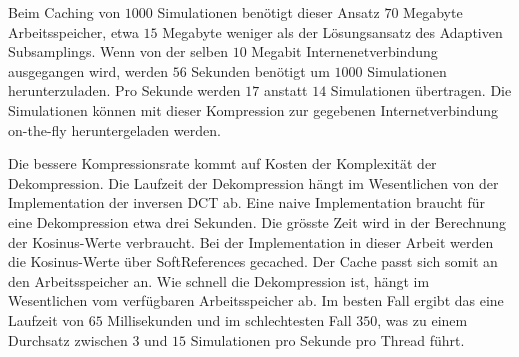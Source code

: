Beim Caching von $1000$ Simulationen benötigt dieser Ansatz $70$ Megabyte Arbeitsspeicher, etwa $15$ Megabyte weniger als der Lösungsansatz des Adaptiven Subsamplings. Wenn von der selben $10$ Megabit Internenetverbindung ausgegangen wird, werden $56$ Sekunden benötigt um $1000$ Simulationen herunterzuladen. Pro Sekunde werden $17$ anstatt $14$ Simulationen übertragen. Die Simulationen können mit dieser Kompression zur gegebenen Internetverbindung on-the-fly heruntergeladen werden.

Die bessere Kompressionsrate kommt auf Kosten der Komplexität der Dekompression. Die Laufzeit der Dekompression hängt im Wesentlichen von der Implementation der inversen DCT ab. Eine naive Implementation braucht für eine Dekompression etwa drei Sekunden. Die grösste Zeit wird in der Berechnung der Kosinus-Werte verbraucht. Bei der Implementation in dieser Arbeit werden die Kosinus-Werte über SoftReferences gecached. Der Cache passt sich somit an den Arbeitsspeicher an. Wie schnell die Dekompression ist, hängt im Wesentlichen vom verfügbaren Arbeitsspeicher ab. Im besten Fall ergibt das eine Laufzeit von $65$ Millisekunden und im schlechtesten Fall $350$, was zu einem Durchsatz zwischen $3$ und $15$ Simulationen pro Sekunde pro Thread führt.